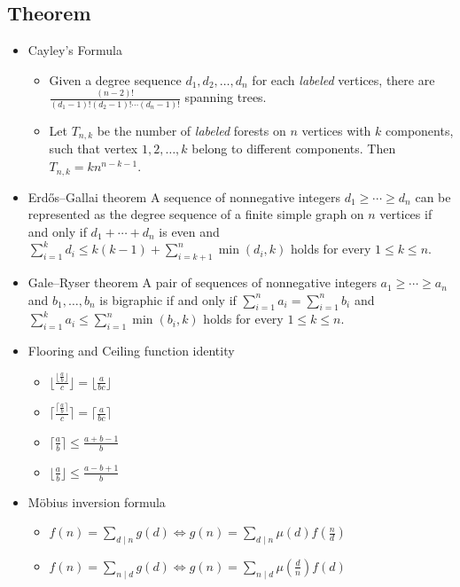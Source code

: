 \documentclass[10pt, a4paper, twocolumn, oneside]{article}
\begin{document}
\subsection{Theorem}
\begin{itemize}
\item Cayley's Formula
\begin{itemize}
    \itemsep-0.5em
  \item Given a degree sequence $d_1, d_2, \ldots, d_n$ for each \textit{labeled} vertices, there are $\frac{(n - 2)!}{(d_1 - 1)!(d_2 - 1)!\cdots(d_n - 1)!}$ spanning trees.
  \item Let $T_{n, k}$ be the number of \textit{labeled} forests on $n$ vertices with $k$ components, such that vertex $1, 2, \ldots, k$ belong to different components. Then $T_{n, k} = kn^{n - k - 1}$.
\end{itemize}
\item Erdős–Gallai theorem 
A sequence of nonnegative integers $d_1\ge\cdots\ge d_n$ can be represented as the degree sequence of a finite simple graph on $n$ vertices if and only if $d_1+\cdots+d_n$ is even and $\displaystyle\sum_{i=1}^kd_i\le k(k-1)+\displaystyle\sum_{i=k+1}^n\min(d_i,k)$ holds for every $1\le k\le n$.
\item Gale–Ryser theorem
A pair of sequences of nonnegative integers $a_1\ge\cdots\ge a_n$ and $b_1,\ldots,b_n$ is bigraphic if and only if $\displaystyle\sum_{i=1}^n a_i=\displaystyle\sum_{i=1}^n b_i$ and $\displaystyle\sum_{i=1}^k a_i\le \displaystyle\sum_{i=1}^n\min(b_i,k)$ holds for every $1\le k\le n$.
\item Flooring and Ceiling function identity
\begin{itemize} 
    \itemsep-0.1em
  \item $\lfloor \frac{\lfloor \frac{a}{b} \rfloor}{c} \rfloor = \lfloor \frac{a}{bc} \rfloor$
  \item $\lceil \frac{\lceil \frac{a}{b} \rceil}{c} \rceil = \lceil \frac{a}{bc} \rceil$
  \item $\lceil \frac{a}{b} \rceil \leq \frac{a+b-1}{b}$
  \item $\lfloor \frac{a}{b} \rfloor \leq \frac{a-b+1}{b}$ 
\end{itemize}
\item Möbius inversion formula
\begin{itemize}
    \itemsep-0.5em
  \item $f(n)=\sum_{d\mid n}g(d)\Leftrightarrow g(n)=\sum_{d\mid n}\mu(d)f(\frac{n}{d})$
  \item $f(n)=\sum_{n\mid d}g(d)\Leftrightarrow g(n)=\sum_{n\mid d}\mu(\frac{d}{n})f(d)$

\end{itemize}
\end{itemize}
\end{document}
